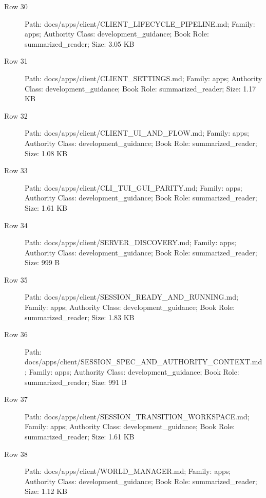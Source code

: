 \documentclass[9pt,a4paper]{book}
\begin{document}
\begin{description}
\item[Row 30] Path: docs/\allowbreak{}apps/\allowbreak{}client/\allowbreak{}CLIENT\_\allowbreak{}LIFECYCLE\_\allowbreak{}PIPELINE.\allowbreak{}md; Family: apps; Authority Class: development\_\allowbreak{}guidance; Book Role: summarized\_\allowbreak{}reader; Size: 3.\allowbreak{}05 KB
\item[Row 31] Path: docs/\allowbreak{}apps/\allowbreak{}client/\allowbreak{}CLIENT\_\allowbreak{}SETTINGS.\allowbreak{}md; Family: apps; Authority Class: development\_\allowbreak{}guidance; Book Role: summarized\_\allowbreak{}reader; Size: 1.\allowbreak{}17 KB
\item[Row 32] Path: docs/\allowbreak{}apps/\allowbreak{}client/\allowbreak{}CLIENT\_\allowbreak{}UI\_\allowbreak{}AND\_\allowbreak{}FLOW.\allowbreak{}md; Family: apps; Authority Class: development\_\allowbreak{}guidance; Book Role: summarized\_\allowbreak{}reader; Size: 1.\allowbreak{}08 KB
\item[Row 33] Path: docs/\allowbreak{}apps/\allowbreak{}client/\allowbreak{}CLI\_\allowbreak{}TUI\_\allowbreak{}GUI\_\allowbreak{}PARITY.\allowbreak{}md; Family: apps; Authority Class: development\_\allowbreak{}guidance; Book Role: summarized\_\allowbreak{}reader; Size: 1.\allowbreak{}61 KB
\item[Row 34] Path: docs/\allowbreak{}apps/\allowbreak{}client/\allowbreak{}SERVER\_\allowbreak{}DISCOVERY.\allowbreak{}md; Family: apps; Authority Class: development\_\allowbreak{}guidance; Book Role: summarized\_\allowbreak{}reader; Size: 999 B
\item[Row 35] Path: docs/\allowbreak{}apps/\allowbreak{}client/\allowbreak{}SESSION\_\allowbreak{}READY\_\allowbreak{}AND\_\allowbreak{}RUNNING.\allowbreak{}md; Family: apps; Authority Class: development\_\allowbreak{}guidance; Book Role: summarized\_\allowbreak{}reader; Size: 1.\allowbreak{}83 KB
\item[Row 36] Path: docs/\allowbreak{}apps/\allowbreak{}client/\allowbreak{}SESSION\_\allowbreak{}SPEC\_\allowbreak{}AND\_\allowbreak{}AUTHORITY\_\allowbreak{}CONTEXT.\allowbreak{}md; Family: apps; Authority Class: development\_\allowbreak{}guidance; Book Role: summarized\_\allowbreak{}reader; Size: 991 B
\item[Row 37] Path: docs/\allowbreak{}apps/\allowbreak{}client/\allowbreak{}SESSION\_\allowbreak{}TRANSITION\_\allowbreak{}WORKSPACE.\allowbreak{}md; Family: apps; Authority Class: development\_\allowbreak{}guidance; Book Role: summarized\_\allowbreak{}reader; Size: 1.\allowbreak{}61 KB
\item[Row 38] Path: docs/\allowbreak{}apps/\allowbreak{}client/\allowbreak{}WORLD\_\allowbreak{}MANAGER.\allowbreak{}md; Family: apps; Authority Class: development\_\allowbreak{}guidance; Book Role: summarized\_\allowbreak{}reader; Size: 1.\allowbreak{}12 KB

\end{description}
\end{document}
